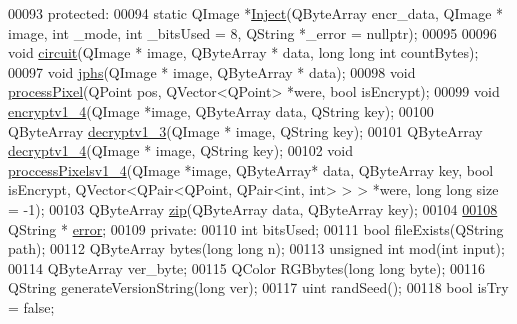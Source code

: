 \begin{DoxyCode}
00093 \textcolor{keyword}{protected}:
00094     \textcolor{keyword}{static} QImage *\hyperlink{class_model_p_c_ac17e68e6aab134621b0d151d74acdc82}{Inject}(QByteArray encr\_data, QImage * image, \textcolor{keywordtype}{int} \_mode, \textcolor{keywordtype}{int} \_bitsUsed = 8, QString
       *\_error = \textcolor{keyword}{nullptr});
00095 
00096     \textcolor{keywordtype}{void} \hyperlink{class_model_p_c_a1d0091062a0c836b283ec2f67411623b}{circuit}(QImage * image, QByteArray * data, \textcolor{keywordtype}{long} \textcolor{keywordtype}{long} \textcolor{keywordtype}{int} countBytes);
00097     \textcolor{keywordtype}{void} \hyperlink{class_model_p_c_a8bee0255c09449868c7e6097afaaf0cd}{jphs}(QImage * image, QByteArray * data);
00098     \textcolor{keywordtype}{void} \hyperlink{class_model_p_c_a1171f9fe1550133dc9053a46b4e5bcfd}{processPixel}(QPoint pos, QVector<QPoint> *were, \textcolor{keywordtype}{bool} isEncrypt);
00099     \textcolor{keywordtype}{void} \hyperlink{class_model_p_c_a4daefc3fb87a1f19172b9b20c987eb12}{encryptv1\_4}(QImage *image, QByteArray data, QString key);
00100     QByteArray \hyperlink{class_model_p_c_a4fe70ebbedfaf31d45a35f82d0f06caa}{decryptv1\_3}(QImage * image, QString key);
00101     QByteArray \hyperlink{class_model_p_c_a7a1f7d491e1bde16936190b9e90896b0}{decryptv1\_4}(QImage * image, QString key);
00102     \textcolor{keywordtype}{void} \hyperlink{class_model_p_c_a5cdb4d1d61ff62ee9d45b496a7dbf1fb}{proccessPixelsv1\_4}(QImage *image, QByteArray* data, QByteArray key, \textcolor{keywordtype}{bool} 
      isEncrypt, QVector<QPair<QPoint, QPair<int, int> > > *were, \textcolor{keywordtype}{long} \textcolor{keywordtype}{long} size = -1);
00103     QByteArray \hyperlink{class_model_p_c_afebbbfa4b07deba4f68fc6dfb50f353f}{zip}(QByteArray data, QByteArray key);
00104 
\hypertarget{modelpc_8h_source.tex_l00108}{}\hyperlink{class_model_p_c_a4e5a9c0ca1f06fe5bc478b6bf248c37c}{00108}     QString * \hyperlink{class_model_p_c_a4e5a9c0ca1f06fe5bc478b6bf248c37c}{error};
00109 \textcolor{keyword}{private}:
00110     \textcolor{keywordtype}{int} bitsUsed;
00111     \textcolor{keywordtype}{bool} fileExists(QString path);
00112     QByteArray bytes(\textcolor{keywordtype}{long} \textcolor{keywordtype}{long} n);
00113     \textcolor{keywordtype}{unsigned} \textcolor{keywordtype}{int} mod(\textcolor{keywordtype}{int} input);
00114     QByteArray ver\_byte;
00115     QColor RGBbytes(\textcolor{keywordtype}{long} \textcolor{keywordtype}{long} byte);
00116     QString generateVersionString(\textcolor{keywordtype}{long} ver);
00117     uint randSeed();
00118     \textcolor{keywordtype}{bool} isTry = \textcolor{keyword}{false};

\end{DoxyCode}
